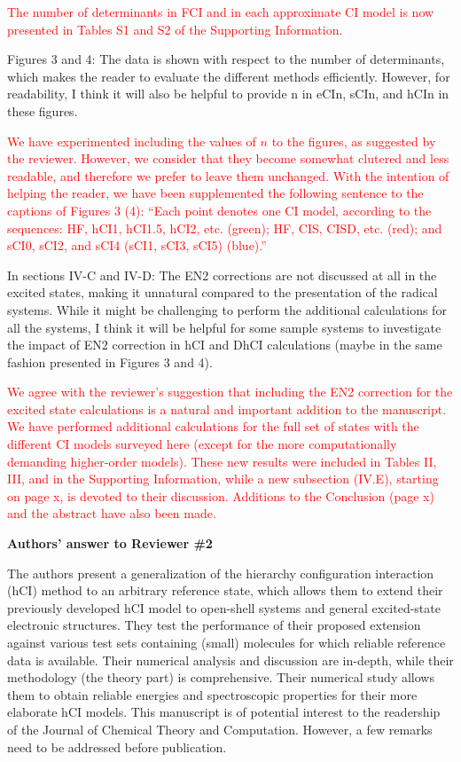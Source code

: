 \documentclass[10pt]{letter}
\newcommand{\alert}[1]{\textcolor{red}{#1}}
\begin{document}
\begin{letter}
\alert{
The number of determinants in FCI and in each approximate CI model is now presented in Tables S1 and S2 of the Supporting Information.
}

{Figures 3 and 4: The data is shown with respect to the number of determinants, which makes the
reader to evaluate the different methods efficiently. However, for readability, I think it will also be
helpful to provide n in eCIn, sCIn, and hCIn in these figures.
}

\alert{
We have experimented including the values of $n$ to the figures, as suggested by the reviewer.
However, we consider that they become somewhat clutered and less readable, and therefore we prefer to leave them unchanged.
With the intention of helping the reader, we have been supplemented the following sentence to the captions of Figures 3 (4):
``Each point denotes one CI model, according to the sequences: HF, hCI1, hCI1.5, hCI2, etc. (green); HF, CIS, CISD, etc. (red); and sCI0, sCI2, and sCI4 (sCI1, sCI3, sCI5) (blue).''
}

{In sections IV-C and IV-D: The EN2 corrections are not discussed at all in the excited states, making
it unnatural compared to the presentation of the radical systems. While it might be challenging to
perform the additional calculations for all the systems, I think it will be helpful for some sample
systems to investigate the impact of EN2 correction in hCI and DhCI calculations (maybe in the
same fashion presented in Figures 3 and 4).
}

\alert{
We agree with the reviewer's suggestion that including the EN2 correction for the excited state calculations is a natural and important addition to the manuscript.
We have performed additional calculations for the full set of states with the different CI models surveyed here (except for the more computationally demanding higher-order models).
These new results were included in Tables II, III, and in the Supporting Information, while a new subsection (IV.E), starting on page x, is devoted to their discussion.
Additions to the Conclusion (page x) and the abstract have also been made.
}

\clearpage

\noindent \textbf{\large Authors' answer to Reviewer \#2}

{The authors present a generalization of the hierarchy configuration interaction (hCI) method to an arbitrary reference state, which allows them to extend their previously developed hCI model to open-shell systems and general excited-state electronic structures. They test the performance of their proposed extension against various test sets containing (small) molecules for which reliable reference data is available. Their numerical analysis and discussion are in-depth, while their methodology (the theory part) is comprehensive. Their numerical study allows them to obtain reliable energies and spectroscopic properties for their more elaborate hCI models. This manuscript is of potential interest to the readership of the Journal of Chemical Theory and Computation. However, a few remarks need to be addressed before publication.
}


\end{letter}
\end{document}
